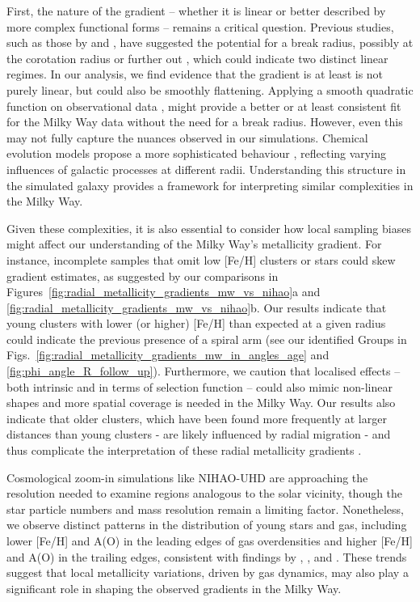 \documentclass[twocolumn,apj,numberedappendix,appendixfloats,twocolappendix]{openjournal}
\begin{document}
\begin{CJK*}{UTF8}{gbsn}
First, the nature of the gradient -- whether it is linear or better described by more complex functional forms -- remains a critical question. Previous studies, such as those by \citet{Lepine2011} and \citet{Donor2020}, have suggested the potential for a break radius, possibly at the corotation radius or further out \citep{Scarano2013}, which could indicate two distinct linear regimes. In our analysis, we find evidence that the gradient is at least is not purely linear, but could also be smoothly flattening. Applying a smooth quadratic function on observational data \citep{Yong2012, Andrievsky2004, Genovali2014}, might provide a better or at least consistent fit for the Milky Way data without the need for a break radius. However, even this may not fully capture the nuances observed in our simulations. Chemical evolution models propose a more sophisticated behaviour \citep[e.g.][]{Chiappini2001, Kubryk2015, Palla2024}, reflecting varying influences of galactic processes at different radii. Understanding this structure in the simulated galaxy provides a framework for interpreting similar complexities in the Milky Way.

Given these complexities, it is also essential to consider how local sampling biases might affect our understanding of the Milky Way's metallicity gradient. For instance, incomplete samples that omit low [Fe/H] clusters or stars could skew gradient estimates, as suggested by our comparisons in Figures~\ref{fig:radial_metallicity_gradients_mw_vs_nihao}a and \ref{fig:radial_metallicity_gradients_mw_vs_nihao}b. Our results indicate that young clusters with lower (or higher) [Fe/H] than expected at a given radius could indicate the previous presence of a spiral arm (see our identified Groups in Figs.~\ref{fig:radial_metallicity_gradients_mw_in_angles_age} and \ref{fig:phi_angle_R_follow_up}). Furthermore, we caution that localised effects -- both intrinsic and in terms of selection function -- could also mimic non-linear shapes and more spatial coverage is needed in the Milky Way. Our results also indicate that older clusters, which have been found more frequently at larger distances than young clusters - are likely influenced by radial migration - and thus complicate the interpretation of these radial metallicity gradients \citep{Magrini2009, Lepine2011}.

Cosmological zoom-in simulations like NIHAO-UHD are approaching the resolution needed to examine regions analogous to the solar vicinity, though the star particle numbers and mass resolution remain a limiting factor. Nonetheless, we observe distinct patterns in the distribution of young stars and gas, including lower [Fe/H] and A(O) in the leading edges of gas overdensities and higher [Fe/H] and A(O) in the trailing edges, consistent with findings by \citet{Grand2016}, \citet{Ho2017c}, and \citet{Kreckel2019}. These trends suggest that local metallicity variations, driven by gas dynamics, may also play a significant role in shaping the observed gradients in the Milky Way.


\end{CJK*}
\end{document}
